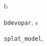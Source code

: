\documentclass[letterpaper,10pt,english]{sphinxmanual}
\begin{document}
\renewcommand{\indexname}{Python Module Index}
\begin{theindex}
\def\bigletter#1{{\Large\sffamily#1}\nopagebreak\vspace{1mm}}
\bigletter{b}
\item {\texttt{bdevopar}}, \pageref{bdevopar:module-bdevopar}
\indexspace
\bigletter{s}
\item {\texttt{splat\_model}}, \pageref{splat_model:module-splat_model}
\end{theindex}

\renewcommand{\indexname}{Index}
\printindex
\end{document}
